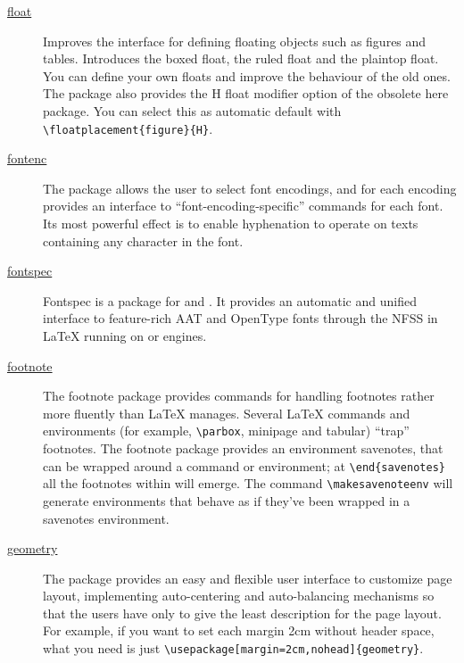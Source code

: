 \begin{description}
	\item[\href{https://www.ctan.org/pkg/float}{float}] Improves the interface for defining floating objects such as figures and tables. Introduces the boxed float, the ruled float and the plaintop float. You can define your own floats and improve the behaviour of the old ones. The package also provides the H float modifier option of the obsolete here package. You can select this as automatic default with \verb|\floatplacement{figure}{H}|. \cite{CTANTeam.2020k}
	
	\item[\href{https://www.ctan.org/pkg/fontenc}{fontenc}] The package allows the user to select font encodings, and for each encoding provides an interface to \enquote{font-encoding-specific} commands for each font. Its most powerful effect is to enable hyphenation to operate on texts containing any character in the font. \cite{CTANTeam.2020aj}
	
	\item[\href{https://www.ctan.org/pkg/fontspec}{fontspec}] Fontspec is a package for {\XeLaTeX} and {\LuaLaTeX}. It provides an automatic and unified interface to feature-rich AAT and OpenType fonts through the NFSS in {\LaTeX} running on {\XeTeX} or {\LuaTeX} engines. \cite{CTANTeam.2020bo}
	
	\item[\href{https://www.ctan.org/pkg/footnote}{footnote}] The footnote package provides commands for handling footnotes rather more fluently than {\LaTeX} manages. Several {\LaTeX} commands and environments (for example, \verb|\parbox|, minipage and tabular) \enquote{trap} footnotes. The footnote package provides an environment savenotes, that can be wrapped around a command or environment; at \verb|\end{savenotes}| all the footnotes within will emerge. The command \verb|\makesavenoteenv| will generate environments that behave as if they've been wrapped in a savenotes environment. \cite{CTANTeam.2020c}
		
	\item[\href{https://www.ctan.org/pkg/geometry}{geometry}] The package provides an easy and flexible user interface to customize page layout, implementing auto-centering and auto-balancing mechanisms so that the users have only to give the least description for the page layout. For example, if you want to set each margin 2cm without header space, what you need is just \verb|\usepackage[margin=2cm,nohead]{geometry}|. \cite{CTANTeam.2020al}
	

\end{description}
